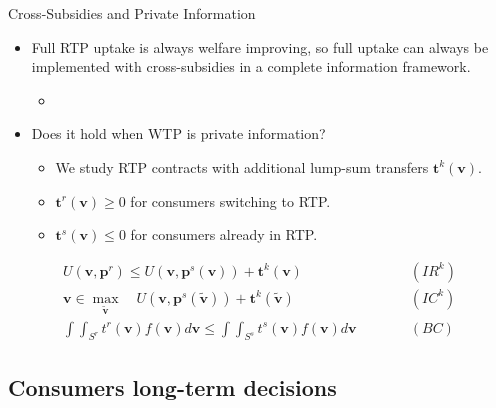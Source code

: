 \documentclass{class}
\begin{document}
\begin{frame}{Cross-Subsidies and Private Information}

\begin{itemize}
    \item Full RTP uptake is always welfare improving, so full uptake can always be implemented with cross-subsidies in a complete information framework. 
    \begin{itemize}
        \item {} \vfill
    \end{itemize}  

\item Does it hold when WTP is private information? 
\begin{itemize}
    \item We study RTP contracts with additional lump-sum transfers $\textbf{t}^k(\textbf{v})$.
    \item $\textbf{t}^r(\textbf{v}) \geq 0$ for consumers switching to RTP.
    \item $\textbf{t}^s(\textbf{v}) \leq 0$ for consumers already in RTP.
\end{itemize}
\end{itemize}
     
     \vfill
     
\begin{equation*}
\begin{aligned}
 U(\textbf{v},\textbf{p}^r) \leq U(\textbf{v},\textbf{p}^s(\textbf{v})) + \textbf{t}^k(\textbf{v}) & \quad \quad \quad (IR^k)\\
 \textbf{v} \in \max_{\tilde{\textbf{v}}} \quad U(\textbf{v},\textbf{p}^s(\tilde{\textbf{v}}) ) + \textbf{t}^k(\tilde{\textbf{v}}) & \quad \quad \quad (IC^k)
 \\
 \int\int_{S^r} t^r(\textbf{v}) f(\textbf{v})d\textbf{v}  \leq  \int\int_{S^s} t^s(\textbf{v}) f(\textbf{v})d\textbf{v}  & \quad \quad \quad (BC)
\end{aligned}
\end{equation*}

\end{frame}


\subsection{Consumers long-term decisions}
\end{document}
